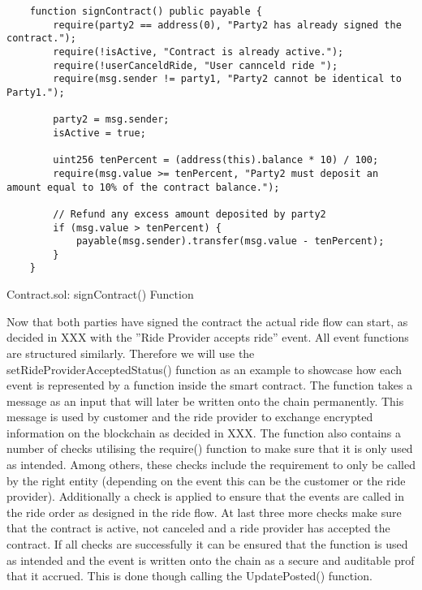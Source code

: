 \begin{Listing}
\begin{lstlisting}
    function signContract() public payable {
        require(party2 == address(0), "Party2 has already signed the contract.");
        require(!isActive, "Contract is already active.");
        require(!userCanceldRide, "User cannceld ride ");
        require(msg.sender != party1, "Party2 cannot be identical to Party1.");
        
        party2 = msg.sender;
        isActive = true;

        uint256 tenPercent = (address(this).balance * 10) / 100;
        require(msg.value >= tenPercent, "Party2 must deposit an amount equal to 10% of the contract balance.");

        // Refund any excess amount deposited by party2
        if (msg.value > tenPercent) {
            payable(msg.sender).transfer(msg.value - tenPercent);
        }
    }
\end{lstlisting}
  \caption{Contract.sol: signContract() Function}
  \label{lst:signContract}
\end{Listing}

Now that both parties have signed the contract the actual ride flow can start, as decided in XXX with the ''Ride Provider accepts ride'' event. All event functions are structured similarly. Therefore we will use the setRideProviderAcceptedStatus() function as an example to showcase how each event is represented by a function inside the smart contract. The function takes a message as an input that will later be written onto the chain permanently. This message is used by customer and the ride provider to exchange encrypted information on the blockchain as decided in XXX. The function also contains a number of checks utilising the require() function to make sure that it is only used as intended. Among others, these checks include the requirement to only be called by the right entity (depending on the event this can be the customer or the ride provider). Additionally a check is applied to ensure that the events are called in the ride order as designed in the ride flow. At last three more checks make sure that the contract is active, not canceled and a ride provider has accepted the contract. If all checks are successfully it can be ensured that the function is used as intended and the event is written onto the chain as a secure and auditable prof that it accrued. This is done though calling the UpdatePosted() function.

